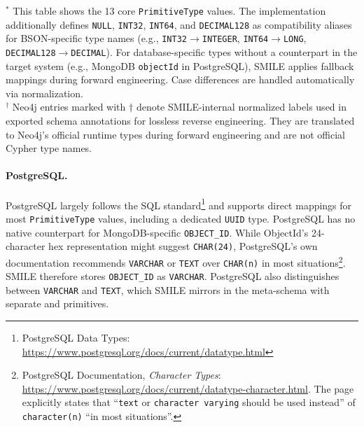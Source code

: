 \begin{table}[t]
  \vspace{0.15cm}
  \begin{flushleft}
  \footnotesize
  $^{\ast}$ This table shows the 13 core \texttt{PrimitiveType} values. The implementation additionally
  defines \texttt{NULL}, \texttt{INT32}, \texttt{INT64}, and \texttt{DECIMAL128} as compatibility
  aliases for BSON-specific type names (e.g., \texttt{INT32}$\to$\texttt{INTEGER},
  \texttt{INT64}$\to$\texttt{LONG}, \texttt{DECIMAL128}$\to$\texttt{DECIMAL}). For database-specific
  types without a counterpart in the target system (e.g., MongoDB \texttt{objectId} in PostgreSQL),
  SMILE applies fallback mappings during forward engineering. Case differences are handled
  automatically via normalization.\\
  $^{\dagger}$ Neo4j entries marked with $\dagger$ denote SMILE-internal normalized labels used in
  exported schema annotations for lossless reverse engineering. They are translated to Neo4j's
  official runtime types during forward engineering and are not official Cypher type names.
  \end{flushleft}
  \end{table}

 \paragraph{PostgreSQL.}
PostgreSQL largely follows the SQL standard\footnote{PostgreSQL Data
  Types: \url{https://www.postgresql.org/docs/current/datatype.html}}
  and supports direct mappings for most \texttt{Primi\-tive\-Type}
  values, including a dedicated \texttt{UUID} type. PostgreSQL has no
  native counterpart for MongoDB-specific \texttt{OBJECT\_ID}. While
  ObjectId's 24-character hex representation might suggest
  \texttt{CHAR(24)}, PostgreSQL's own documentation recommends
  \texttt{VARCHAR} or \texttt{TEXT} over \texttt{CHAR(n)} in most
  situations\footnote{PostgreSQL Documentation, \emph{Character Types}:
  \url{https://www.postgresql.org/docs/current/datatype-character.html}.
  The page explicitly states that ``\texttt{text} or \texttt{character
  varying} should be used instead'' of \texttt{character(n)} ``in most
  situations''.}. SMILE therefore stores \texttt{OBJECT\_ID} as
  \texttt{VARCHAR}. PostgreSQL also distinguishes between
  \texttt{VARCHAR} and \texttt{TEXT}, which SMILE mirrors in the
  meta-schema with separate  and  primitives.


